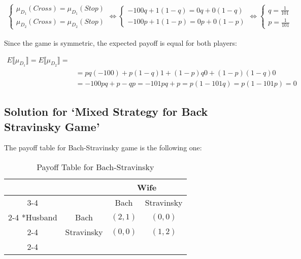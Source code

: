 \documentclass{article}
\begin{document}
\begin{align*}
    \begin{cases}
        \mu_{D_1}(\textit{Cross})  = \mu_{D_1}(\textit{Stop}) \\
        \mu_{D_2}(\textit{Cross})  = \mu_{D_2}(\textit{Stop})
    \end{cases}
    \iff
    \begin{cases}
        -100q + 1(1 - q) = 0 q + 0(1 - q) \\
        -100p + 1(1 - p) = 0 p + 0(1 - p)
    \end{cases}
    \iff
    \begin{cases}
        q = \frac{1}{101} \\
        p = \frac{1}{101}
    \end{cases}
\end{align*}

\noindent Since the game is symmetric, the expected payoff is equal for both players:

\begin{align*}
    E \llbracket \mu_{D_1} \rrbracket = E \llbracket \mu_{D_2} \rrbracket = \\
    & = pq(-100) + p(1- q)1 + (1- p)q0 + (1 - p)(1 - q)0 \\
    & = -100pq + p - qp = -101pq + p = p (1 - 101q) = p(1 - 101p) = 0
\end{align*}

\subsection{Solution for `Mixed Strategy for Back Stravinsky Game'}

The payoff table for Bach-Stravinsky game is the following one:

\begin{table}[h!]
    \centering
    \setlength{\extrarowheight}{2pt}
    \begin{tabular}{*{4}{c|}}
      \multicolumn{2}{c}{} & \multicolumn{2}{c}{Wife}\\\cline{3-4}
      \multicolumn{1}{c}{} &  & Bach  & Stravinsky \\\cline{2-4}
      \multirow{2}*{Husband}  & Bach & $(2,1)$ & $(0, 0)$ \\\cline{2-4}
      & Stravinsky & $(0, 0)$ & $(1, 2)$ \\\cline{2-4}
    \end{tabular}
    \caption{Payoff Table for Bach-Stravinsky}
\end{table}
\end{document}
